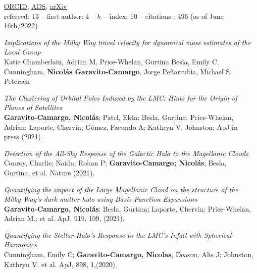 \documentclass[UTF8]{article}
\begin{document}
\noindent \href{https://orcid.org/0000-0001-7107-1744}{ORCID},
\href{https://ui.adsabs.harvard.edu/search/q=docs(library%2F0X5_bcuLT4iE-6-Nko0kmg)&sort=date%20desc%2C%20bibcode%20desc&p_=0}{ADS},
\href{https://arxiv.org/search/?query=garavito-camargo&searchtype=all}{arXiv}\\
refereed: 13 -- first author: 4 -- $h-$index: 10 -- citations :
496 (as of June 16th/2022) 
\begin{etaremune}

\item \textit{Implications of the Milky Way travel velocity for dynamical mass
  estimates of the Local Group}\\
  Katie Chamberlain, Adrian M. Price-Whelan, Gurtina Besla, Emily C. Cunningham, \textbf{Nicol\'as Garavito-Camargo}, Jorge Peñarrubia, Michael S. Petersen\\

\item \textit{The Clustering of Orbital Poles Induced by the LMC: Hints for
      the Origin of Planes of Satellites}\\ 
      \textbf{Garavito-Camargo, Nicol\'as}; Patel, Ekta; Besla, Gurtina; Price-Whelan,
      Adrian; Laporte, Chervin; G\'omez, Facundo A; Kathryn V. Johnston; ApJ
      in press (2021). 

\item \textit{Detection of the All-Sky Response of the Galactic
  Halo to the Magellanic Clouds}\\ 
  Conroy, Charlie; Naidu, Rohan P; \textbf{Garavito-Camargo; Nicol\'as}; Besla,
  Gurtina; et al. Nature (2021). 

\item \textit{Quantifying the impact of the Large Magellanic Cloud on the
  structure of the Milky Way’s dark matter halo using Basis Function Expansions}\\ 
  \textbf{Garavito-Camargo, Nicol\'as}; Besla, Gurtina; Laporte,
  Chervin; Price-Whelan, Adrian M.; et al. ApJ, 919, 109, (2021). 

\item \textit{Quantifying the Stellar Halo's Response to the LMC's Infall with
  Spherical Harmonics}.\\
  Cunningham, Emily C; \textbf{Garavito-Camargo, Nicolas}, Deason, Alis J;
  Johnston, Kathryn V. et al. ApJ, 898, 1,(2020).


\end{etaremune}
\end{document}
